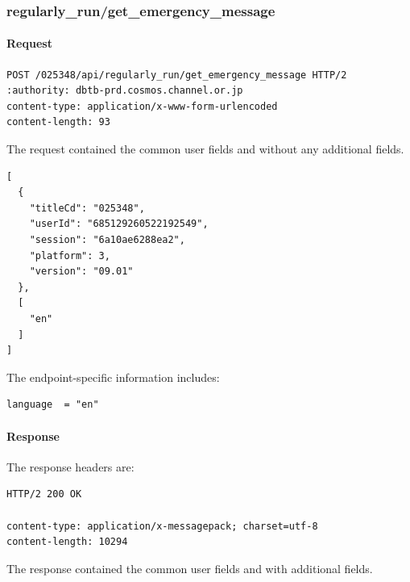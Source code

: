\subsubsection{regularly\_run/get\_emergency\_message}
\label{subsec:api_regularly_run_get_emergency_message}

\paragraph{Request}

\begin{lstlisting}
POST /025348/api/regularly_run/get_emergency_message HTTP/2
:authority: dbtb-prd.cosmos.channel.or.jp
content-type: application/x-www-form-urlencoded
content-length: 93
\end{lstlisting}

The request contained the common user fields and without any additional fields.

\begin{lstlisting}
[
  {
    "titleCd": "025348",
    "userId": "685129260522192549",
    "session": "6a10ae6288ea2",
    "platform": 3,
    "version": "09.01"
  },
  [
    "en"
  ]
]
\end{lstlisting}

The endpoint-specific information includes:

\begin{lstlisting}
language  = "en"
\end{lstlisting}

\paragraph{Response}

The response headers are:

\begin{lstlisting}
HTTP/2 200 OK

content-type: application/x-messagepack; charset=utf-8
content-length: 10294
\end{lstlisting}

The response contained the common user fields and with additional fields.

